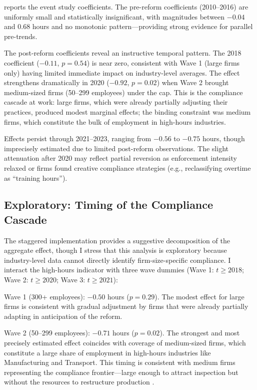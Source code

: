 \documentclass[12pt]{article}
\begin{document}
 reports the event study coefficients. The pre-reform coefficients (2010--2016) are uniformly small and statistically insignificant, with magnitudes between $-0.04$ and $0.68$ hours and no monotonic pattern---providing strong evidence for parallel pre-trends.

The post-reform coefficients reveal an instructive temporal pattern. The 2018 coefficient ($-0.11$, $p = 0.54$) is near zero, consistent with Wave 1 (large firms only) having limited immediate impact on industry-level averages. The effect strengthens dramatically in 2020 ($-0.92$, $p = 0.02$) when Wave 2 brought medium-sized firms (50--299 employees) under the cap. This is the compliance cascade at work: large firms, which were already partially adjusting their practices, produced modest marginal effects; the binding constraint was medium firms, which constitute the bulk of employment in high-hours industries.

Effects persist through 2021--2023, ranging from $-0.56$ to $-0.75$ hours, though imprecisely estimated due to limited post-reform observations. The slight attenuation after 2020 may reflect partial reversion as enforcement intensity relaxed or firms found creative compliance strategies (e.g., reclassifying overtime as ``training hours'').



\subsection{Exploratory: Timing of the Compliance Cascade}

The staggered implementation provides a suggestive decomposition of the aggregate effect, though I stress that this analysis is exploratory because industry-level data cannot directly identify firm-size-specific compliance. I interact the high-hours indicator with three wave dummies (Wave 1: $t \geq 2018$; Wave 2: $t \geq 2020$; Wave 3: $t \geq 2021$):

Wave 1 (300+ employees): $-0.50$ hours ($p = 0.29$). The modest effect for large firms is consistent with gradual adjustment by firms that were already partially adapting in anticipation of the reform.

Wave 2 (50--299 employees): $-0.71$ hours ($p = 0.02$). The strongest and most precisely estimated effect coincides with coverage of medium-sized firms, which constitute a large share of employment in high-hours industries like Manufacturing and Transport. This timing is consistent with medium firms representing the compliance frontier---large enough to attract inspection but without the resources to restructure production \citep{lee2021}.
\end{document}
